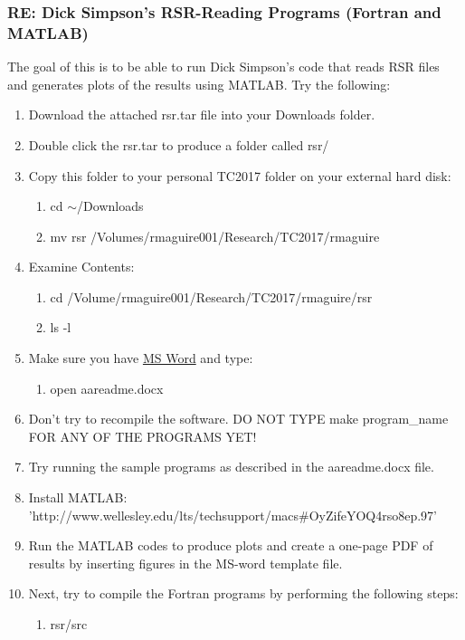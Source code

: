 \documentclass[crop=false,class=book]{standalone}
\begin{document}
\subsubsection{\footnotesize RE: Dick Simpson's RSR-Reading Programs (Fortran and MATLAB)}
The goal of this is to be able to run Dick Simpson's code that reads RSR files and generates plots of the results using MATLAB. Try the following:
\begin{enumerate}
    \item Download the attached rsr.tar file into your Downloads folder.
    \item Double click the rsr.tar to produce a folder called rsr/
    \item Copy this folder to your personal TC2017 folder on your external hard disk:
    \begin{enumerate}
        \item[] cd $\sim$/Downloads
        \item[] mv rsr /Volumes/rmaguire001/Research/TC2017/rmaguire
    \end{enumerate}
    \item Examine Contents:
    \begin{enumerate}
        \item[] cd /Volume/rmaguire001/Research/TC2017/rmaguire/rsr
        \item[] ls -l
    \end{enumerate}
    \item Make sure you have \href{http://www.wellesley.edu/lts/office365\#38MbQkK5QQom6URk.97}{MS Word} and type:
    \begin{enumerate}
        \item[] open aareadme.docx
    \end{enumerate}
    \item Don't try to recompile the software. DO NOT TYPE make program\_name FOR ANY OF THE PROGRAMS YET!
    \item Try running the sample programs as described in the aareadme.docx file.
    \item Install MATLAB: 'http://www.wellesley.edu/lts/techsupport/macs\#OyZifeYOQ4rso8ep.97'
    \item Run the MATLAB codes to produce plots and create a one-page PDF of results by inserting figures in the MS-word template file.
    \item Next, try to compile the Fortran programs by performing the following steps:
    \begin{enumerate}
        \item[] rsr/src

\end{enumerate}
\end{enumerate}
\end{document}
